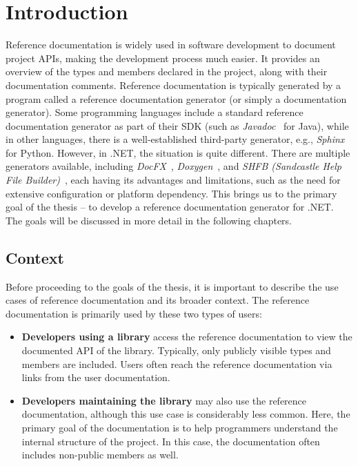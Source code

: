 \chapter{Introduction}
\label{ch:first}

Reference documentation is widely used in software development to document project APIs, making the development process much easier.
It provides an overview of the types and members declared in the project, along with their documentation comments.
Reference documentation is typically generated by a program called a reference documentation generator (or simply a documentation generator).
Some programming languages include a standard reference documentation generator as part of their SDK (such as \textit{Javadoc}~\cite{javadoc} for Java), while in other languages, there is a well-established third-party generator, e.g., \textit{Sphinx}~\cite{sphinx} for Python.
However, in .NET, the situation is quite different.
There are multiple generators available, including \textit{DocFX}~\cite{docfx}, \textit{Doxygen}~\cite{doxygen}, and \textit{SHFB (Sandcastle Help File Builder)}~\cite{shfb}, each having its advantages and limitations, 
such as the need for extensive configuration or platform dependency.
This brings us to the primary goal of the thesis -- to develop a reference documentation generator for .NET.
The goals will be discussed in more detail in the following chapters.

\section{Context}
\label{section:context}

Before proceeding to the goals of the thesis, it is important to describe the use cases of reference documentation and its broader context.
The reference documentation is primarily used by these two types of users:
\begin{itemize}
    \item \textbf{Developers using a library} access the reference documentation to view the documented API  of the library. 
    Typically, only publicly visible types and members are included. 
    Users often reach the reference documentation via links from the user documentation.
    \item \textbf{Developers maintaining the library} may also use the reference documentation, although this use case is considerably less common.
    Here, the primary goal of the documentation is to help programmers understand the internal structure of the project. 
    In this case, the documentation often includes non-public members as well.
\end{itemize}

